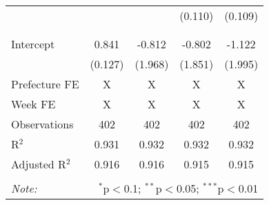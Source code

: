 \begin{table}[!htbp]
\begin{tabular}{@{\extracolsep{5pt}}lcccc}
  &  &  & (0.110) & (0.109) \\ 
  & & & & \\ 
\hline \\[-1.8ex] 
Intercept & 0.841 & -0.812 & -0.802 & -1.122 \\ 
 & (0.127) & (1.968) & (1.851) & (1.995) \\ 
Prefecture FE & X & X & X & X \\ 
Week FE & X & X & X & X \\ 
Observations & 402 & 402 & 402 & 402 \\ 
R$^{2}$ & 0.931 & 0.932 & 0.932 & 0.932 \\ 
Adjusted R$^{2}$ & 0.916 & 0.916 & 0.915 & 0.915 \\ 
\hline 
\hline \\[-1.8ex] 
\textit{Note:}  & \multicolumn{4}{r}{$^{*}$p$<$0.1; $^{**}$p$<$0.05; $^{***}$p$<$0.01} \\ 
\end{tabular} 
\end{table} 

